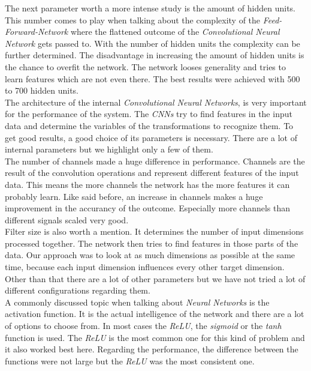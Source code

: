 \documentclass[oneside]{msvreport}%
\newcommand{\e}[1]{\emph{#1}}
\begin{document}
\noindent The next parameter worth a more intense study is the amount of hidden units. This number comes to play when talking about the complexity of the \e{Feed-Forward-Network} where the flattened outcome of the \e{Convolutional Neural Network} gets passed to. With the number of hidden units the complexity can be further determined. The disadvantage in increasing the amount of hidden units is the chance to overfit the network. The network looses generality and tries to learn features which are not even there. The best results were achieved with 500 to 700 hidden units.\\

\noindent The architecture of the internal \e{Convolutional Neural Networks}, is very important for the performance of the system. The \e{CNNs} try to find features in the input data and determine the variables of the transformations to recognize them. To get good results, a good choice of its parameters is necessary. There are a lot of internal parameters but we highlight only a few of them. \\
The number of channels made a huge difference in performance. Channels are the result of the convolution operations and represent different features of the input data. This means the more channels the network has the more features it can probably learn. Like said before, an increase in channels makes a huge improvement in the accurancy of the outcome. Especially more channels than different signals scaled very good.\\
Filter size is also worth a mention. It determines the number of input dimensions processed together. The network then tries to find features in those parts of the data. Our approach was to look at as much dimensions as possible at the same time, because each input dimension influences every other target dimension.\\
Other than that there are a lot of other parameters but we have not tried a lot of different configurations regarding them.\\

\noindent A commonly discussed topic when talking about \e{Neural Networks} is the activation function. It is the actual intelligence of the network and there are a lot of options to choose from. In most cases the \e{ReLU}, the \e{sigmoid} or the \e{tanh} function is used. The \e{ReLU} is the most common one for this kind of problem and it also worked best here. Regarding the performance, the difference between the functions were not large but the \e{ReLU} was the most consistent one.\\ 
\end{document}
